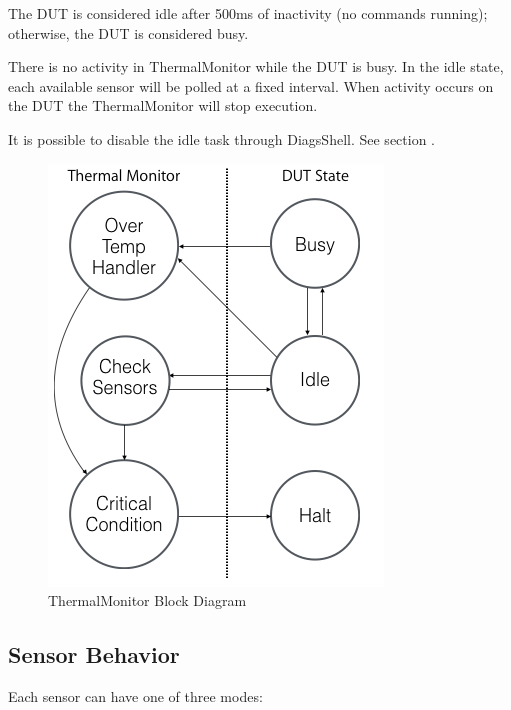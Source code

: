 The DUT is considered idle after 500ms of inactivity (no commands running);
otherwise, the DUT is considered busy.

There is no activity in ThermalMonitor while the DUT is busy.  In the idle
state, each available sensor will be polled at a fixed interval.  When
activity occurs on the DUT the ThermalMonitor will stop execution.

It is possible to disable the idle task through DiagsShell. See section
.

\begin{figure}[!htb]
\begin{center}
	\includegraphics[scale=0.75]{TM_BlockDiagram}

	\caption{ThermalMonitor Block Diagram}
	\label{fig:BlockDiagram}

\end{center}
\end{figure}

\subsection{Sensor Behavior}
\label{sec:SensorBehavior}

Each sensor can have one of three modes:

